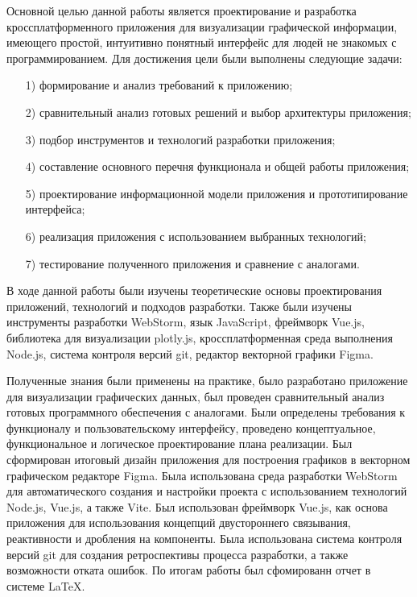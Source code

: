 \conclusion
Основной целью данной работы является проектирование и разработка кроссплатформенного приложения для визуализации графической информации, имеющего простой, интуитивно понятный интерфейс для людей не знакомых с программированием.
Для достижения цели были выполнены следующие задачи:
\begin{enumerate}
    \item [1)] формирование и анализ требований к приложению;
    \item [2)] сравнительный анализ готовых решений и выбор архитектуры приложения;
    \item [3)] подбор инструментов и технологий разработки приложения;
    \item [4)] составление основного перечня функционала и общей работы приложения;
    \item [5)] проектирование информационной модели приложения и прототипирование интерфейса;
    \item [6)] реализация приложения с использованием выбранных технологий;
    \item [7)] тестирование полученного приложения и сравнение с аналогами.
\end{enumerate}

В ходе данной работы были изучены теоретические основы проектирования приложений, технологий и подходов разработки. Также были изучены инструменты разработки WebStorm, язык JavaScript, фреймворк Vue.js, библиотека для визуализации plotly.js, кроссплатформенная среда выполнения Node.js, система контроля версий git, редактор векторной графики Figma. 

Полученные знания были применены на практике, было разработано приложение для визуализации графических данных, был проведен сравнительный анализ готовых программного обеспечения с аналогами. Были определены требования к функционалу и пользовательскому интерфейсу, проведено концептуальное, функциональное и логическое проектирование плана реализации. Был сформирован итоговый дизайн приложения для построения графиков в векторном графическом редакторе Figma. Была использована среда разработки WebStorm для автоматического создания и настройки проекта с использованием технологий Node.js, Vue.js, а также Vite. Был использован фреймворк Vue.js, как основа приложения для использования концепций двустороннего связывания, реактивности и дробления на компоненты. Была использована система контроля версий git для создания ретроспективы процесса разработки, а также возможности отката ошибок. По итогам работы был сфомированн отчет в системе \LaTeX.

